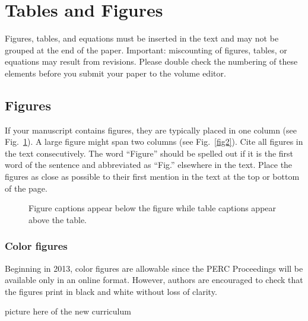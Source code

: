 \documentclass[english,aps,pra,reprint,noshowpacs,superscriptaddress]{revtex4-1}
\begin{document}
\section{Tables and Figures}

Figures, tables, and equations must be inserted in the text and may
not be grouped at the end of the paper. Important: miscounting of
figures, tables, or equations may result from revisions. Please double
check the numbering of these elements before you submit your paper to
the volume editor.

\subsection{Figures}

If your manuscript contains figures, they are typically placed in one
column (see Fig.\ \ref{fig1}).  A large figure might span two columns
(see Fig.\ \ref{fig2}).  Cite all figures in the text
consecutively. The word ``Figure'' should be spelled out if it is the
first word of the sentence and abbreviated as ``Fig.'' elsewhere in
the text. Place the figures as close as possible to their first
mention in the text at the top or bottom of the page.

\begin{figure}
\caption{Figure captions appear below the figure while table captions appear above the table.\label{fig1}}
\end{figure}


\subsubsection{Color figures}
Beginning in 2013, color figures are allowable since the PERC
Proceedings will be available only in an online format.  However,
authors are encouraged to check that the figures print in black and
white without loss of clarity.

\begin{figure*}
  picture here of the new curriculum
\caption{A 2-column figure. Center figure captions if they run one
  line only, and justify captions if they are multi-line.\label{fig2}}
\end{figure*}
\end{document}
